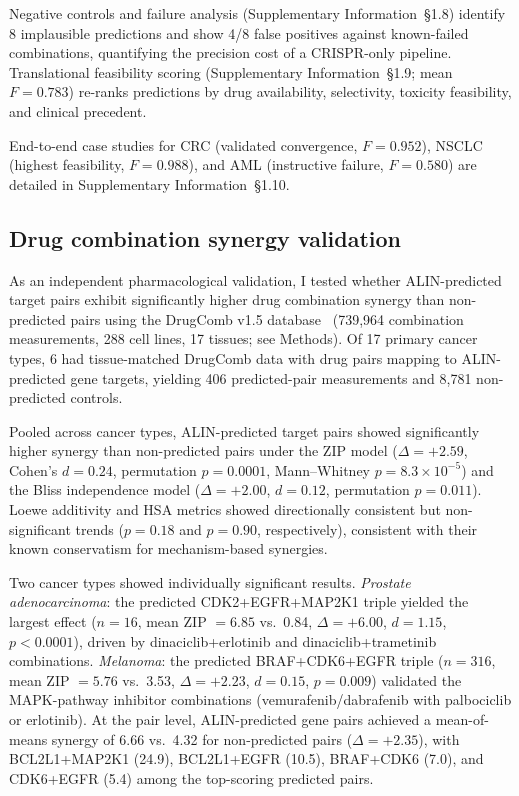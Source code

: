 \documentclass[11pt]{article}
\begin{document}
Negative controls and failure analysis (Supplementary Information~\S1.8) identify 8 implausible predictions and show 4/8 false positives against known-failed combinations, quantifying the precision cost of a CRISPR-only pipeline. Translational feasibility scoring (Supplementary Information~\S1.9; mean $F = 0.783$) re-ranks predictions by drug availability, selectivity, toxicity feasibility, and clinical precedent.

End-to-end case studies for CRC (validated convergence, $F = 0.952$), NSCLC (highest feasibility, $F = 0.988$), and AML (instructive failure, $F = 0.580$) are detailed in Supplementary Information~\S1.10.

\subsection*{Drug combination synergy validation}
As an independent pharmacological validation, I tested whether ALIN-predicted target pairs exhibit significantly higher drug combination synergy than non-predicted pairs using the DrugComb v1.5 database~\cite{Zagidullin2019,Zheng2022} (739{,}964 combination measurements, 288 cell lines, 17 tissues; see Methods). Of 17 primary cancer types, 6 had tissue-matched DrugComb data with drug pairs mapping to ALIN-predicted gene targets, yielding 406 predicted-pair measurements and 8{,}781 non-predicted controls.

Pooled across cancer types, ALIN-predicted target pairs showed significantly higher synergy than non-predicted pairs under the ZIP model ($\Delta = +2.59$, Cohen's $d = 0.24$, permutation $p = 0.0001$, Mann--Whitney $p = 8.3 \times 10^{-5}$) and the Bliss independence model ($\Delta = +2.00$, $d = 0.12$, permutation $p = 0.011$). Loewe additivity and HSA metrics showed directionally consistent but non-significant trends ($p = 0.18$ and $p = 0.90$, respectively), consistent with their known conservatism for mechanism-based synergies.

Two cancer types showed individually significant results. \emph{Prostate adenocarcinoma}: the predicted CDK2+EGFR+MAP2K1 triple yielded the largest effect ($n = 16$, mean ZIP $= 6.85$ vs.\ 0.84, $\Delta = +6.00$, $d = 1.15$, $p < 0.0001$), driven by dinaciclib+erlotinib and dinaciclib+trametinib combinations. \emph{Melanoma}: the predicted BRAF+CDK6+EGFR triple ($n = 316$, mean ZIP $= 5.76$ vs.\ 3.53, $\Delta = +2.23$, $d = 0.15$, $p = 0.009$) validated the MAPK-pathway inhibitor combinations (vemurafenib/dabrafenib with palbociclib or erlotinib). At the pair level, ALIN-predicted gene pairs achieved a mean-of-means synergy of 6.66 vs.\ 4.32 for non-predicted pairs ($\Delta = +2.35$), with BCL2L1+MAP2K1 (24.9), BCL2L1+EGFR (10.5), BRAF+CDK6 (7.0), and CDK6+EGFR (5.4) among the top-scoring predicted pairs.
\end{document}
